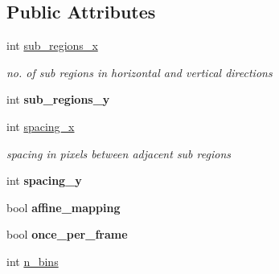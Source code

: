 \subsection*{Public Attributes}
\begin{DoxyCompactItemize}
\item 
\hypertarget{structLSCVParams_a860f0e810ba71e5b17284c1b3988eecb}{int \hyperlink{structLSCVParams_a860f0e810ba71e5b17284c1b3988eecb}{sub\-\_\-regions\-\_\-x}}\label{structLSCVParams_a860f0e810ba71e5b17284c1b3988eecb}

\begin{DoxyCompactList}\small\item\em no. of sub regions in horizontal and vertical directions \end{DoxyCompactList}\item 
\hypertarget{structLSCVParams_a03c25ce4a4367baabf5e3f3d4eeb5b77}{int {\bfseries sub\-\_\-regions\-\_\-y}}\label{structLSCVParams_a03c25ce4a4367baabf5e3f3d4eeb5b77}

\item 
\hypertarget{structLSCVParams_a5dd6b23d122f89fc756fde0b8895215a}{int \hyperlink{structLSCVParams_a5dd6b23d122f89fc756fde0b8895215a}{spacing\-\_\-x}}\label{structLSCVParams_a5dd6b23d122f89fc756fde0b8895215a}

\begin{DoxyCompactList}\small\item\em spacing in pixels between adjacent sub regions \end{DoxyCompactList}\item 
\hypertarget{structLSCVParams_aef6eccb85b118949bc26a64bd452c8ff}{int {\bfseries spacing\-\_\-y}}\label{structLSCVParams_aef6eccb85b118949bc26a64bd452c8ff}

\item 
\hypertarget{structLSCVParams_aa18e192bb9ff644d4246e7bb98eaae6f}{bool {\bfseries affine\-\_\-mapping}}\label{structLSCVParams_aa18e192bb9ff644d4246e7bb98eaae6f}

\item 
\hypertarget{structLSCVParams_aa08d7a53ba293792b080777e1e22f058}{bool {\bfseries once\-\_\-per\-\_\-frame}}\label{structLSCVParams_aa08d7a53ba293792b080777e1e22f058}

\item 
\hypertarget{structLSCVParams_aa3ff2ada51e5ee8693bb3fdf59700974}{int \hyperlink{structLSCVParams_aa3ff2ada51e5ee8693bb3fdf59700974}{n\-\_\-bins}}\label{structLSCVParams_aa3ff2ada51e5ee8693bb3fdf59700974}


\end{DoxyCompactItemize}
